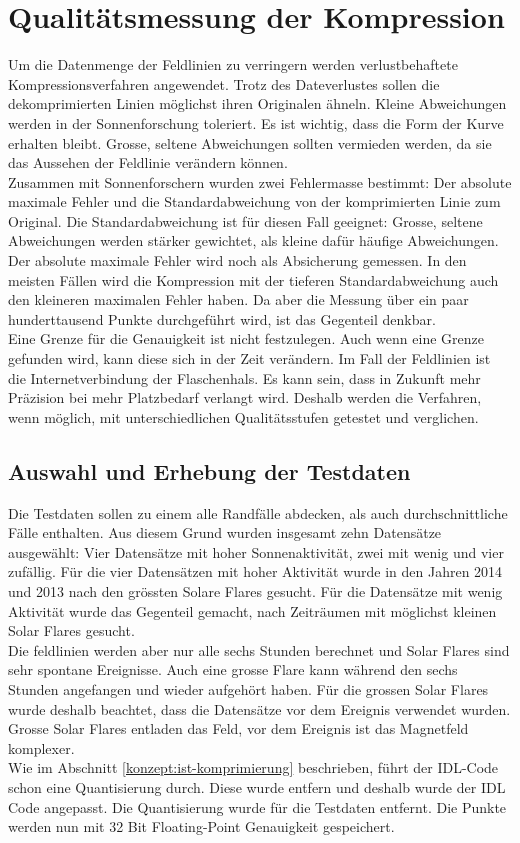 \section{Qualitätsmessung der Kompression}
Um die Datenmenge der Feldlinien zu verringern werden verlustbehaftete Kompressionsverfahren angewendet. Trotz des Dateverlustes sollen die dekomprimierten Linien möglichst ihren Originalen ähneln. Kleine Abweichungen werden in der Sonnenforschung toleriert. Es ist wichtig, dass die Form der Kurve erhalten bleibt. Grosse, seltene Abweichungen sollten vermieden werden, da sie das Aussehen der Feldlinie verändern können.\\
[\baselineskip]
Zusammen mit Sonnenforschern wurden zwei Fehlermasse bestimmt: Der absolute maximale Fehler und die Standardabweichung von der komprimierten Linie zum Original. Die Standardabweichung ist für diesen Fall geeignet: Grosse, seltene Abweichungen werden stärker gewichtet, als kleine dafür häufige Abweichungen.\\
Der absolute maximale Fehler wird noch als Absicherung gemessen. In den meisten Fällen wird die Kompression mit der tieferen Standardabweichung auch den kleineren maximalen Fehler haben. Da aber die Messung über ein paar hunderttausend Punkte durchgeführt wird, ist das Gegenteil denkbar.\\
[\baselineskip]
Eine Grenze für die Genauigkeit ist nicht festzulegen. Auch wenn eine Grenze gefunden wird, kann diese sich in der Zeit verändern. Im Fall der Feldlinien ist die Internetverbindung der Flaschenhals. Es kann sein, dass in Zukunft mehr Präzision bei mehr Platzbedarf verlangt wird. Deshalb werden die Verfahren, wenn möglich, mit unterschiedlichen Qualitätsstufen getestet und verglichen.

\subsection{Auswahl und Erhebung der Testdaten}
Die Testdaten sollen zu einem alle Randfälle abdecken, als auch durchschnittliche Fälle enthalten. Aus diesem Grund wurden insgesamt zehn Datensätze ausgewählt: Vier Datensätze mit hoher Sonnenaktivität, zwei mit wenig und vier zufällig. Für die vier Datensätzen mit hoher Aktivität wurde in den Jahren 2014 und 2013 nach den grössten Solare Flares gesucht. Für die Datensätze mit wenig Aktivität wurde das Gegenteil gemacht, nach Zeiträumen mit möglichst kleinen Solar Flares gesucht.\\
Die feldlinien werden aber nur alle sechs Stunden berechnet und Solar Flares sind sehr spontane Ereignisse. Auch eine grosse Flare kann während den sechs Stunden angefangen und wieder aufgehört haben. Für die grossen Solar Flares wurde deshalb beachtet, dass die Datensätze vor dem Ereignis verwendet wurden. Grosse Solar Flares entladen das Feld, vor dem Ereignis ist das Magnetfeld komplexer.\\
[\baselineskip]
Wie im Abschnitt \ref{konzept:ist-komprimierung} beschrieben, führt der IDL-Code schon eine Quantisierung durch. Diese wurde entfern und  deshalb wurde der IDL Code angepasst. Die Quantisierung wurde für die Testdaten entfernt. Die Punkte werden nun mit 32 Bit Floating-Point Genauigkeit gespeichert.

